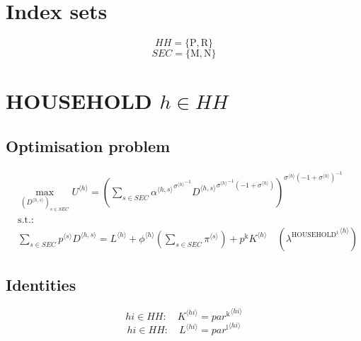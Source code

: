 

\section*{Index sets}

$${H\!H} = \{ \mathrm{P}, \mathrm{R} \}$$
$${S\!E\!C} = \{ \mathrm{M}, \mathrm{N} \}$$

\section{HOUSEHOLD $h\in {H\!H}$}

\subsection{Optimisation problem}

\begin{align}
&\max_{\left({D}^{\langle h,s\rangle}\right)_{s\in {S\!E\!C}}
} {U}^{\langle h\rangle} = \left(\sum_{s\in {S\!E\!C}} {{{\alpha}^{\langle h,s\rangle}}^{{{\sigma}^{\langle h\rangle}}^{-1}}} {{{D}^{\langle h,s\rangle}}^{{{\sigma}^{\langle h\rangle}}^{-1} \left(-1 + {\sigma}^{\langle h\rangle}\right)}}\right)^{{{\sigma}^{\langle h\rangle}} \left(-1 + {\sigma}^{\langle h\rangle}\right)^{-1}}\\
&\mathrm{s.t.:}\nonumber\\
& \sum_{s\in {S\!E\!C}} {{p}^{\langle s\rangle}} {{D}^{\langle h,s\rangle}} = {L}^{\langle h\rangle} + {{\phi}^{\langle h\rangle}} \left(\sum_{s\in {S\!E\!C}} {\pi}^{\langle s\rangle}\right) + {p^{\mathrm{k}}} {{K}^{\langle h\rangle}} \quad \left({\lambda^{\mathrm{HOUSEHOLD}^{\mathrm{1}}}}^{\langle h\rangle}\right)
\end{align}


\subsection{Identities}

\begin{equation}
{h\!i}\in {H\!H}\colon\quad {K}^{\langle {h\!i}\rangle} = {{p\!a\!r}^{\mathrm{k}}}^{\langle {h\!i}\rangle}
\end{equation}
\begin{equation}
{h\!i}\in {H\!H}\colon\quad {L}^{\langle {h\!i}\rangle} = {{p\!a\!r}^{\mathrm{l}}}^{\langle {h\!i}\rangle}
\end{equation}


